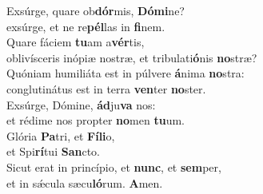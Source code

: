 \oddverse Exsúrge, quare ob\textbf{dór}mis, \textbf{Dó}\textbf{mi}ne?~\*\\
\oddverse exsúrge, et ne re\textbf{pél}las in \textbf{fi}nem.\\
\evenverse Quare fáciem \textbf{tu}am a\textbf{vér}tis,~\*\\
\evenverse oblivísceris inópiæ nostræ, et tribulati\textbf{ó}nis \textbf{no}stræ?\\
\oddverse Quóniam humiliáta est in púlvere \textbf{á}nima \textbf{no}stra:~\*\\
\oddverse conglutinátus est in terra \textbf{ven}ter \textbf{no}ster.\\
\evenverse Exsúrge, Dómine, \textbf{ád}ju\textbf{va} nos:~\*\\
\evenverse et rédime nos propter \textbf{no}men \textbf{tu}um.\\
\oddverse Glória \textbf{Pa}tri, et \textbf{Fí}\textbf{li}o,~\*\\
\oddverse et Spi\textbf{rí}tui \textbf{San}cto.\\
\evenverse Sicut erat in princípio, et \textbf{nunc}, et \textbf{sem}per,~\*\\
\evenverse et in sǽcula sæcu\textbf{ló}rum. \textbf{A}men.\\
